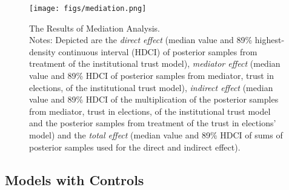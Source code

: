 \documentclass[11pt, ngerman,english,a4]{article}
\begin{document}
\begin{figure}[H]
	\centering
	\texttt{[image: figs/mediation.png]}
	\caption{The Results of Mediation Analysis.  \\
		\footnotesize{Notes: Depicted are the \textit{direct effect }(median value and 89\% highest-density continuous interval (HDCI) of posterior samples from treatment of the institutional trust model), \textit{mediator effect} (median value and 89\% HDCI of posterior samples from mediator, trust in elections, of the institutional trust model), \textit{indirect effect} (median value and 89\% HDCI of the multiplication of the posterior samples from mediator, trust in elections,  of the institutional trust model and the posterior samples from treatment of the trust in elections' model) and the \textit{total effect} (median value and 89\% HDCI of sums of posterior samples used for the direct and indirect effect).  } 
	}
	\singlespacing
	\raggedright
	\label{fig:mediation}
\end{figure}

\clearpage
\subsection*{Models with Controls}
\end{document}
